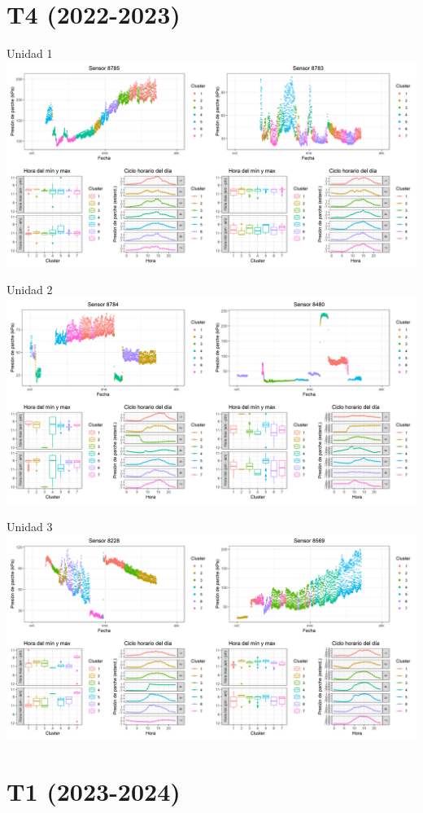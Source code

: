 \documentclass[
  letterpaper,
  DIV=11,
  numbers=noendperiod]{scrreprt}
\begin{document}
\chapter{T4 (2022-2023)}

Unidad 1
\includegraphics{figuras/01_turgor_sensor/2022_2023_La_Esperanza_T4_Unidad_1.png}

Unidad 2
\includegraphics{figuras/01_turgor_sensor/2022_2023_La_Esperanza_T4_Unidad_2.png}

Unidad 3
\includegraphics{figuras/01_turgor_sensor/2022_2023_La_Esperanza_T4_Unidad_3.png}

\chapter{T1 (2023-2024)}
\end{document}
